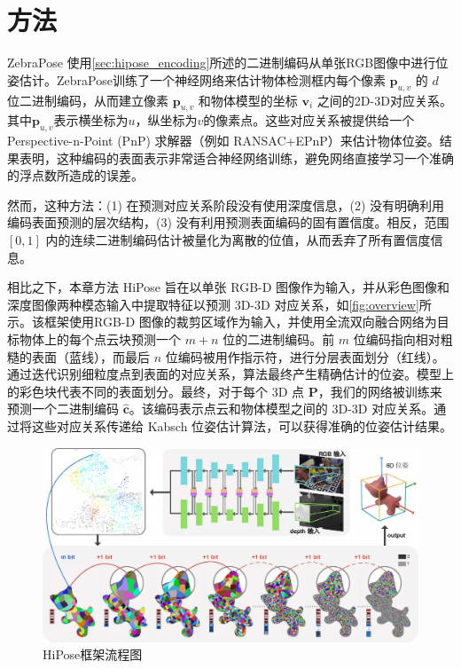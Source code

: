 \section{方法}

ZebraPose\cite{su2022zebrapose} 使用\autoref{sec:hipose_encoding}所述的二进制编码从单张RGB图像中进行位姿估计。ZebraPose训练了一个神经网络来估计物体检测框内每个像素 $\mathbf{p}_{u,v}$ 的 $d$ 位二进制编码，从而建立像素 $\mathbf{p}_{u,v}$ 和物体模型的坐标 $\mathbf{v}_{i}$ 之间的2D-3D对应关系。其中$\mathbf{p}_{u,v}$表示横坐标为$u$，纵坐标为$v$的像素点。这些对应关系被提供给一个Perspective-n-Point (PnP) 求解器（例如 RANSAC+EPnP\cite{EPnP}）来估计物体位姿。结果表明，这种编码的表面表示非常适合神经网络训练，避免网络直接学习一个准确的浮点数所造成的误差。

然而，这种方法：(1) 在预测对应关系阶段没有使用深度信息，(2) 没有明确利用编码表面预测的层次结构，(3) 没有利用预测表面编码的固有置信度。相反，范围 $[0,1]$ 内的连续二进制编码估计被量化为离散的位值，从而丢弃了所有置信度信息。

相比之下，本章方法 HiPose 旨在以单张 RGB-D 图像作为输入，并从彩色图像和深度图像两种模态输入中提取特征以预测 3D-3D 对应关系，如\autoref{fig:overview}所示。该框架使用RGB-D 图像的裁剪区域作为输入，并使用全流双向融合网络为目标物体上的每个点云块预测一个 $m+n$ 位的二进制编码。前 $m$ 位编码指向相对粗糙的表面（蓝线），而最后 $n$ 位编码被用作指示符，进行分层表面划分（红线）。通过迭代识别细粒度点到表面的对应关系，算法最终产生精确估计的位姿。模型上的彩色块代表不同的表面划分。最终，对于每个 3D 点 $\mathbf{P}$，我们的网络被训练来预测一个二进制编码 $\hat{\mathbf{c}}$。该编码表示点云和物体模型之间的 3D-3D 对应关系。通过将这些对应关系传递给 Kabsch 位姿估计算法\cite{umeyama1991least}，可以获得准确的位姿估计结果。

\begin{figure}[ht]
    \centering
    \includegraphics[width=\textwidth]{figure/hipose/overview.pdf}
    \caption{HiPose框架流程图}
    \label{fig:overview}
\end{figure}


